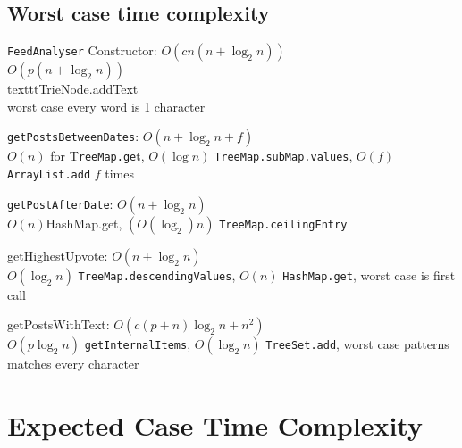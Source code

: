 \documentclass[11pt, oneside]{article}   	%
\begin{document}
\subsection{Worst case time complexity}

\begin{description}

\item \texttt{FeedAnalyser} Constructor: $O(c n (n + \log_2 n))$ \\
$O(p (n + \log_2 n))$ \\texttt{TrieNode.addText} \\ worst case every word is 1 character 
\item \texttt{getPostsBetweenDates}: $O(n + \log_2 n + f)$ \\
$O(n)$ for T\texttt{reeMap.ge}t, $O(\log n)$ \texttt{TreeMap.subMap.values}, $O(f)$ \texttt{ArrayList.add} $f$ times 
\item \texttt{getPostAfterDate}: $O(n + \log_2n)$ \\
$O(n)$HashMap.get, $(O(\log_2) n)$ \texttt{TreeMap.ceilingEntry} 
\item getHighestUpvote: $O(n + \log_2 n)$ \\
$O(\log_2 n)$ \texttt{TreeMap.descendingValues}, $O(n)$ \texttt{HashMap.get}, worst case is first call 
\item getPostsWithText: $O(c (p + n) \log_2 n + n^2)$ \\
$O(p \log_2 n)$ \texttt{getInternalItems}, $O(\log_2 n)$ \texttt{TreeSet.add}, worst case patterns matches every character 

\end{description}

\section{Expected Case Time Complexity}
\end{document}
